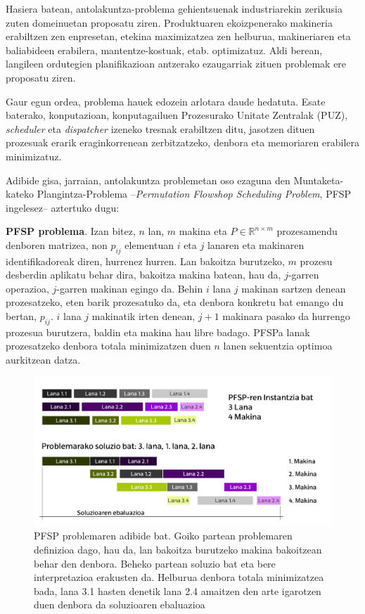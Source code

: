 \documentclass[eu]{ifirak}\usepackage[]{graphicx}\usepackage[]{color}
\begin{document}
Hasiera batean, antolakuntza-problema gehientsuenak industriarekin zerikusia zuten domeinuetan proposatu ziren. Produktuaren ekoizpenerako makineria erabiltzen zen enpresetan, etekina maximizatzea zen helburua, makineriaren eta baliabideen erabilera, mantentze-kostuak, etab. optimizatuz. Aldi berean, langileen ordutegien planifikazioan antzerako ezaugarriak zituen problemak ere proposatu ziren.

Gaur egun ordea, problema hauek edozein arlotara daude hedatuta. Esate baterako, konputazioan, konputagailuen Prozesurako Unitate Zentralak (PUZ), \textit{scheduler} eta \textit{dispatcher} izeneko tresnak erabiltzen ditu, jasotzen dituen prozesuak erarik eraginkorrenean zerbitzatzeko, denbora eta memoriaren erabilera minimizatuz.

Adibide gisa, jarraian, antolakuntza problemetan oso ezaguna den Muntaketa-kateko Plangintza-Problema --\textit{Permutation Flowshop Scheduling Problem}, PFSP ~\cite{gupta2006} ingelesez-- aztertuko dugu:

\begin{ifdefinition} {\bf PFSP problema}. Izan bitez, $n$ lan, $m$ makina eta $P\in\mathbb{R}^{n\times m}$ prozesamendu denboren matrizea, non $p_{ij}$ elementuan $i$ eta $j$ lanaren eta makinaren identifikadoreak diren, hurrenez hurren. Lan bakoitza burutzeko, $m$ prozesu desberdin aplikatu behar dira, bakoitza makina batean, hau da, $j$-garren operazioa, $j$-garren makinan egingo da. Behin $i$ lana $j$ makinan sartzen denean prozesatzeko, eten barik prozesatuko da, eta denbora konkretu bat emango du bertan, $p_{ij}$. $i$ lana $j$ makinatik irten denean, $j+1$ makinara pasako da hurrengo prozesua burutzera, baldin eta makina hau libre badago. PFSPa lanak prozesatzeko denbora totala minimizatzen duen $n$ lanen sekuentzia optimoa aurkitzean datza.
\end{ifdefinition}

\begin{figure}[t]
\centering
\includegraphics[width=0.75\linewidth]{./Irudiak/PFSP}
\caption{PFSP problemaren adibide bat. Goiko partean problemaren definizioa dago, hau da, lan bakoitza burutzeko makina bakoitzean behar den denbora. Beheko partean soluzio bat eta bere interpretazioa erakusten da. Helburua denbora totala minimizatzea bada, lana 3.1 hasten denetik lana 2.4 amaitzen den arte igarotzen duen denbora da soluzioaren ebaluazioa}
\label{fig:pfsp}
\end{figure}
\end{document}
